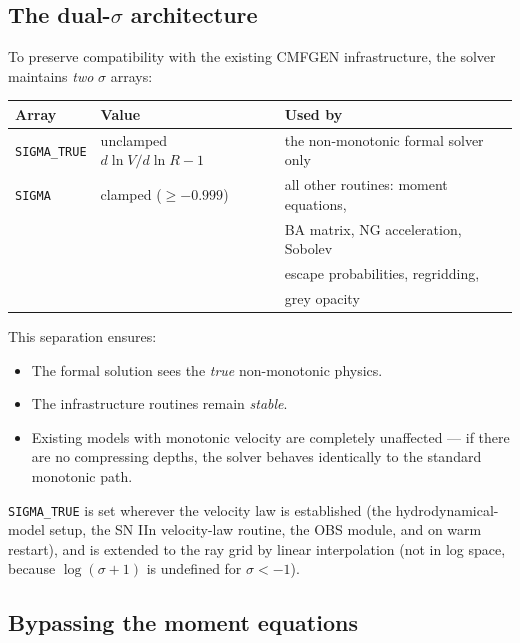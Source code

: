 \documentclass[11pt]{article}
\begin{document}
\subsection{The dual-$\sigma$ architecture}

To preserve compatibility with the existing CMFGEN infrastructure, the
solver maintains \emph{two} $\sigma$ arrays:

\begin{center}
\begin{tabular}{lll}
\toprule
Array & Value & Used by \\
\midrule
\texttt{SIGMA\_TRUE} & unclamped $d\ln V/d\ln R - 1$ &
   the non-monotonic formal solver only \\
\texttt{SIGMA}       & clamped ($\ge -0.999$)        &
   all other routines: moment equations, \\
                     &                              &
   BA matrix, NG acceleration, Sobolev \\
                     &                              &
   escape probabilities, regridding, \\
                     &                              &
   grey opacity \\
\bottomrule
\end{tabular}
\end{center}

This separation ensures:
\begin{itemize}[nosep]
  \item The formal solution sees the \emph{true} non-monotonic physics.
  \item The infrastructure routines remain \emph{stable}.
  \item Existing models with monotonic velocity are completely
        unaffected --- if there are no compressing depths, the solver
        behaves identically to the standard monotonic path.
\end{itemize}

\texttt{SIGMA\_TRUE} is set wherever the velocity law is established
(the hydrodynamical-model setup, the SN IIn velocity-law routine, the
OBS module, and on warm restart), and is extended to the ray grid by
linear interpolation (not in log space, because $\log(\sigma+1)$ is
undefined for $\sigma < -1$).

\subsection{Bypassing the moment equations}
\end{document}
